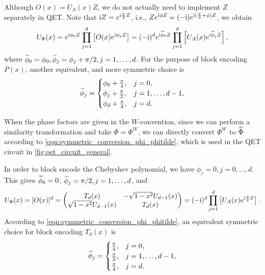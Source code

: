 \begin{rem}
Although $O(x)=U_A(x) Z$, we do not actually need to implement $Z$ separately in QET.
Note that $\mathrm{i} Z=e^{\mathrm{i} \frac{\pi}{2}Z}$, i.e., $Z e^{\mathrm{i} \phi Z}=(-\mathrm{i} ) e^{\mathrm{i} (\frac{\pi}{2}+\phi)Z}$, we obtain
\begin{equation}
U_{\Phi}(x)=
e^{\mathrm{i} \phi_0 Z} \prod_{j=1}^{d} \left[ O(x) e^{\mathrm{i} \phi_j Z} \right]=
(-\mathrm{i})^d e^{\mathrm{i} \widetilde{\phi}_0 Z} \prod_{j=1}^{d} \left[ U_A(x) e^{\mathrm{i} \widetilde{\phi}_j Z} \right],
\label{eqn:modify_qsp}
\end{equation}
where $\widetilde{\phi}_0=\phi_0,\widetilde{\phi}_j=\phi_j+\pi/2,j=1,\ldots, d$.
For the purpose of block encoding $P(x)$, another equivalent, and more symmetric choice is 
\begin{equation}\label{eqn:symmetric_conversion_phi_phitilde}
\widetilde{\phi}_j=\begin{cases}
\phi_0+\frac{\pi}{4},& j=0,\\
\phi_j+\frac{\pi}{2}, & j=1,\ldots,d-1,\\
\phi_d+\frac{\pi}{4},& j=d.\\
\end{cases}
\end{equation}


When the phase factors are given in the $W$-convention, since we can perform a similarity transformation and take $\Phi=\Phi^W$, we can directly convert $\Phi^W$ to $\widetilde{\Phi}$ according to \cref{eqn:symmetric_conversion_phi_phitilde}, which is used in the QET circuit in \cref{fig:qet_circuit_general}.
\end{rem}

\begin{exam}
In order to block encode the Chebyshev polynomial, we have
$\phi_j=0,j=0,\ldots,d$. This gives $\widetilde{\phi}_0=0$, $\widetilde{\phi}_j=\pi/2,j=1,\ldots,d$, and
\begin{equation}
U_{\Phi}(x)=[O(x)]^d=\begin{pmatrix}
T_d(x) & -\sqrt{1-x^2}U_{d-1}(x)\\
\sqrt{1-x^2}U_{d-1}(x) & T_d(x)
\end{pmatrix}=(-\mathrm{i})^d \prod_{j=1}^{d} \left[ U_A(x) e^{\mathrm{i} \frac{\pi}{2} Z} \right].
\end{equation}
According to \cref{eqn:symmetric_conversion_phi_phitilde}, an equivalent symmetric choice for block encoding $T_d(x)$ is
\begin{equation}\widetilde{\phi}_j=\begin{cases}
\frac{\pi}{4},& j=0,\\
\frac{\pi}{2}, & j=1,\ldots,d-1,\\
\frac{\pi}{4},& j=d.\\
\end{cases}
\end{equation}
\end{exam}


